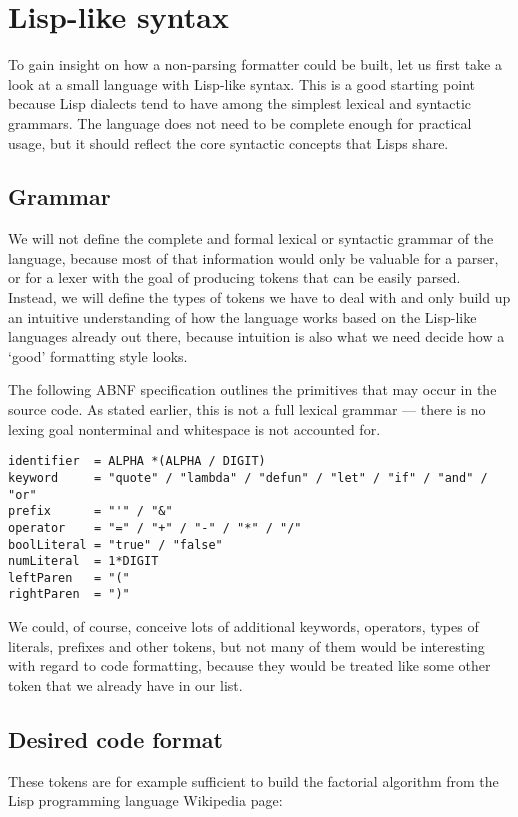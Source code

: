 \chapter{Lisp-like syntax}
To gain insight on how a non-parsing formatter could be built,
let us first take a look at a small language with Lisp-like syntax.
This is a good starting point because Lisp dialects tend to
have among the simplest lexical and syntactic grammars.
The language does not need to be complete enough for practical usage,
but it should reflect the core syntactic concepts that Lisps share.

\section{Grammar}
We will not define the complete and formal lexical or syntactic grammar of the language,
because most of that information would only be valuable for a parser,
or for a lexer with the goal of producing tokens that can be easily parsed.
Instead, we will define the types of tokens we have to deal with
and only build up an intuitive understanding of how the language works
based on the Lisp-like languages already out there,
because intuition is also what we need decide how a `good' formatting style looks.

The following ABNF specification outlines the primitives that may occur in the source code.
As stated earlier, this is not a full lexical grammar ---
there is no lexing goal nonterminal and whitespace is not accounted for.

\begin{verbatim}
identifier  = ALPHA *(ALPHA / DIGIT)
keyword     = "quote" / "lambda" / "defun" / "let" / "if" / "and" / "or"
prefix      = "'" / "&"
operator    = "=" / "+" / "-" / "*" / "/"
boolLiteral = "true" / "false"
numLiteral  = 1*DIGIT
leftParen   = "("
rightParen  = ")"
\end{verbatim}

We could, of course, conceive lots of additional keywords, operators,
types of literals, prefixes and other tokens,
but not many of them would be interesting with regard to code formatting,
because they would be treated like some other token that we already have in our list.

\section{Desired code format}
These tokens are for example sufficient to build the factorial algorithm
from the Lisp programming language Wikipedia page:


